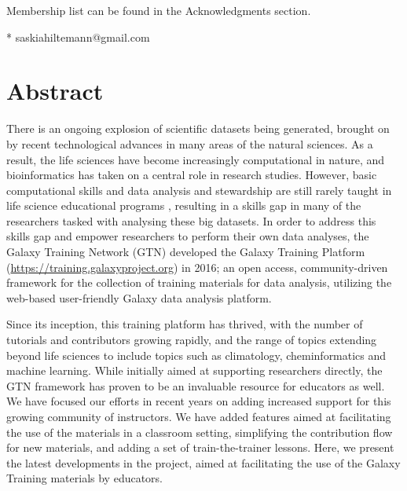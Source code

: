 \documentclass[10pt,letterpaper]{article}
\begin{document}
\begin{flushleft}


\textpilcrow Membership list can be found in the Acknowledgments section.

* saskiahiltemann@gmail.com

\end{flushleft}


\section*{Abstract}
There is an ongoing explosion of scientific datasets being generated, brought on by recent technological advances in many areas of the natural sciences.
As a result, the life sciences have become increasingly computational in nature, and bioinformatics has taken on a central role in research studies.
However, basic computational skills and data analysis and stewardship are still rarely taught in life science educational programs \cite{Attwood2019}, resulting in a skills gap in many of the researchers tasked with analysing these big datasets.
In order to address this skills gap and empower researchers to perform their own data analyses, the Galaxy Training Network (GTN) developed the Galaxy Training Platform (\url{https://training.galaxyproject.org}) in 2016; an open access, community-driven framework for the collection of training materials for data analysis, utilizing the web-based user-friendly Galaxy data analysis platform.

Since its inception, this training platform has thrived, with the number of tutorials and contributors growing rapidly, and the range of topics extending beyond life sciences to include topics such as climatology, cheminformatics and machine learning.
While initially aimed at supporting researchers directly, the GTN framework has proven to be an invaluable resource for educators as well. We have focused our efforts in recent years on adding increased support for this growing community of instructors.
We have added features aimed at facilitating the use of the materials in a classroom setting, simplifying the contribution flow for new materials, and adding a set of train-the-trainer lessons.
Here, we present the latest developments in the project, aimed at facilitating the use of the Galaxy Training materials by educators.
\end{document}
